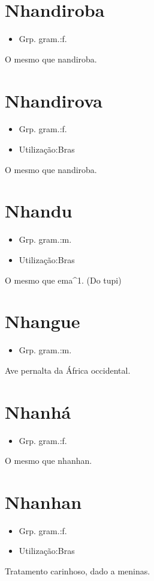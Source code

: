 \section{Nhandiroba}
\begin{itemize}
\item {Grp. gram.:f.}
\end{itemize}
O mesmo que \textunderscore nandiroba\textunderscore .
\section{Nhandirova}
\begin{itemize}
\item {Grp. gram.:f.}
\end{itemize}
\begin{itemize}
\item {Utilização:Bras}
\end{itemize}
O mesmo que \textunderscore nandiroba\textunderscore .
\section{Nhandu}
\begin{itemize}
\item {Grp. gram.:m.}
\end{itemize}
\begin{itemize}
\item {Utilização:Bras}
\end{itemize}
O mesmo que \textunderscore ema\textunderscore ^1.
(Do tupi)
\section{Nhangue}
\begin{itemize}
\item {Grp. gram.:m.}
\end{itemize}
Ave pernalta da África occidental.
\section{Nhanhá}
\begin{itemize}
\item {Grp. gram.:f.}
\end{itemize}
O mesmo que \textunderscore nhanhan\textunderscore .
\section{Nhanhan}
\begin{itemize}
\item {Grp. gram.:f.}
\end{itemize}
\begin{itemize}
\item {Utilização:Bras}
\end{itemize}
Tratamento carinhoso, dado a meninas.
